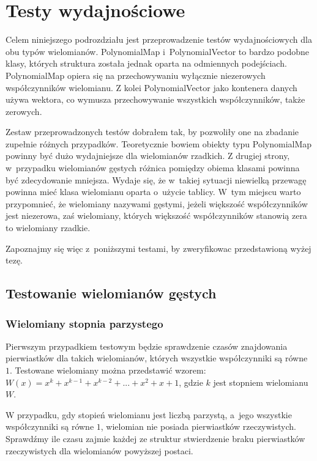 \section{Testy wydajnościowe}

Celem niniejszego podrozdziału jest przeprowadzenie testów wydajnościowych dla obu typów wielomianów. PolynomialMap i~PolynomialVector to bardzo podobne klasy, których struktura została jednak oparta na odmiennych podejściach. PolynomialMap opiera się na przechowywaniu wyłącznie niezerowych współczynników wielomianu. Z kolei PolynomialVector jako kontenera danych używa wektora, co wymusza przechowywanie wszystkich współczynników, także zerowych.

Zestaw przeprowadzonych testów dobrałem tak, by pozwoliły one na zbadanie zupełnie różnych przypadków. Teoretycznie bowiem obiekty typu PolynomialMap powinny być dużo wydajniejsze dla wielomianów rzadkich. Z drugiej strony, w~przypadku wielomianów gęstych różnica pomiędzy obiema klasami powinna być zdecydowanie mniejsza. Wydaje się, że w~takiej sytuacji niewielką przewagę powinna mieć klasa wielomianu oparta o~użycie tablicy. W~tym miejscu warto przypomnieć, że wielomiany nazywami gęstymi, jeżeli większość współczynników jest niezerowa, zaś wielomiany, których większość współczynników stanowią zera to wielomiany rzadkie.

Zapoznajmy się więc z~poniższymi testami, by zweryfikowac przedstawioną wyżej tezę.

\subsection{Testowanie wielomianów gęstych}

\subsubsection{Wielomiany stopnia parzystego}

Pierwszym przypadkiem testowym będzie sprawdzenie czasów znajdowania pierwiastków dla takich wielomianów, których wszystkie współczynniki są równe $1$. Testowane wielomiany można przedstawić wzorem: \\
$W(x) = x^k + x^{k-1} + x^{k-2} + ... + x^2 + x + 1$, gdzie $k$ jest stopniem wielomianu $W$.

W przypadku, gdy stopień wielomianu jest liczbą parzystą, a~jego wszystkie współczynniki są równe $1$, wielomian nie posiada pierwiastków rzeczywistych. Sprawdźmy ile czasu zajmie każdej ze struktur stwierdzenie braku pierwiastków rzeczywistych dla wielomianów powyższej postaci.

